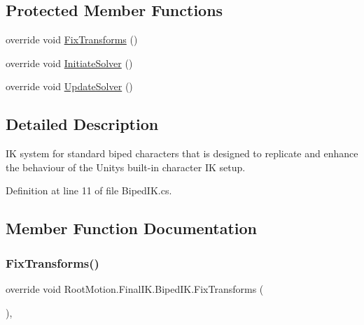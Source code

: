 \subsection*{Protected Member Functions}
\begin{DoxyCompactItemize}
\item 
override void \mbox{\hyperlink{class_root_motion_1_1_final_i_k_1_1_biped_i_k_a0fd11761ce3af861bede6abce987608c}{Fix\+Transforms}} ()
\item 
override void \mbox{\hyperlink{class_root_motion_1_1_final_i_k_1_1_biped_i_k_aa051dcb53a03e693210670bd530e9acd}{Initiate\+Solver}} ()
\item 
override void \mbox{\hyperlink{class_root_motion_1_1_final_i_k_1_1_biped_i_k_a75e17e27c32670ddad2172f03e245632}{Update\+Solver}} ()
\end{DoxyCompactItemize}


\subsection{Detailed Description}
IK system for standard biped characters that is designed to replicate and enhance the behaviour of the Unity\textquotesingle{}s built-\/in character IK setup. 



Definition at line 11 of file Biped\+I\+K.\+cs.



\subsection{Member Function Documentation}
\mbox{\label{class_root_motion_1_1_final_i_k_1_1_biped_i_k_a0fd11761ce3af861bede6abce987608c}} 
\subsubsection{\texorpdfstring{Fix\+Transforms()}{FixTransforms()}}
{\footnotesize\ttfamily override void Root\+Motion.\+Final\+I\+K.\+Biped\+I\+K.\+Fix\+Transforms (\begin{DoxyParamCaption}{ }\end{DoxyParamCaption})\hspace{0.3cm}{\ttfamily [protected]}, {\ttfamily [virtual]}}



